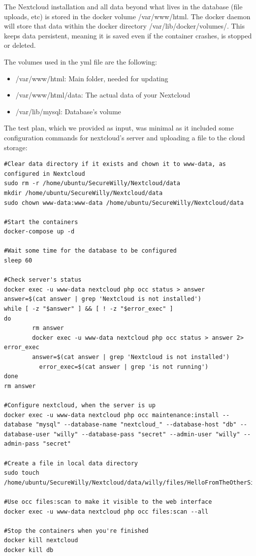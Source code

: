 The Nextcloud installation and all data beyond what lives in the database (file uploads, etc) is stored in the docker volume /var/www/html. The docker daemon will store that data within the docker directory /var/lib/docker/volumes/. This keeps data persistent, meaning it is saved even if the container crashes, is stopped or deleted.

The volumes used in the yml file are the following:
\begin{itemize}
\item /var/www/html: Main folder, needed for updating
\item /var/www/html/data: The actual data of your Nextcloud
\item /var/lib/mysql: Database's volume
\end{itemize}

The test plan, which we provided as input, was minimal as it included some configuration commands for nextcloud's server and uploading a file to the cloud storage:

\begin{lstlisting}[style=bashscript, caption={Test plan used in Nextcloud's project}]
#Clear data directory if it exists and chown it to www-data, as configured in Nextcloud
sudo rm -r /home/ubuntu/SecureWilly/Nextcloud/data
mkdir /home/ubuntu/SecureWilly/Nextcloud/data
sudo chown www-data:www-data /home/ubuntu/SecureWilly/Nextcloud/data

#Start the containers
docker-compose up -d

#Wait some time for the database to be configured
sleep 60

#Check server's status
docker exec -u www-data nextcloud php occ status > answer
answer=$(cat answer | grep 'Nextcloud is not installed')
while [ -z "$answer" ] && [ ! -z "$error_exec" ]
do
        rm answer
        docker exec -u www-data nextcloud php occ status > answer 2> error_exec
        answer=$(cat answer | grep 'Nextcloud is not installed')
		  error_exec=$(cat answer | grep 'is not running')
done
rm answer

#Configure nextcloud, when the server is up
docker exec -u www-data nextcloud php occ maintenance:install --database "mysql" --database-name "nextcloud_" --database-host "db" --database-user "willy" --database-pass "secret" --admin-user "willy" --admin-pass "secret"

#Create a file in local data directory
sudo touch /home/ubuntu/SecureWilly/Nextcloud/data/willy/files/HelloFromTheOtherSide

#Use occ files:scan to make it visible to the web interface
docker exec -u www-data nextcloud php occ files:scan --all

#Stop the containers when you're finished
docker kill nextcloud
docker kill db
\end{lstlisting}

